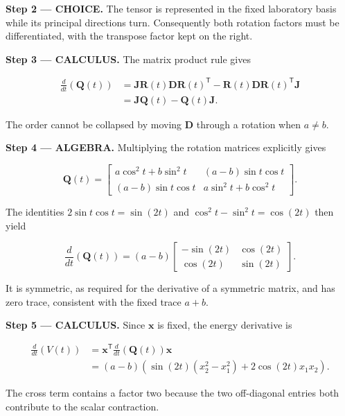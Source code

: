 \documentclass[11pt,oneside,openany]{book}
\begin{document}
\begin{ChoiceStep}
\textbf{Step 2 --- CHOICE.} The tensor is represented in the fixed laboratory basis while its principal directions turn. Consequently both rotation factors must be differentiated, with the transpose factor kept on the right.

\end{ChoiceStep}
\textbf{Step 3 --- CALCULUS.} The matrix product rule gives

\[
\begin{aligned}
\frac{d}{dt}\left(\mathbf Q(t)\right)
&=\mathbf J\mathbf R(t)\mathbf D\mathbf R(t)^{\mathsf T}
-\mathbf R(t)\mathbf D\mathbf R(t)^{\mathsf T}\mathbf J\\
&=\mathbf J\mathbf Q(t)-\mathbf Q(t)\mathbf J.
\end{aligned}
\]

The order cannot be collapsed by moving \(\mathbf D\) through a rotation when \(a\ne b\).

\begingroup\color{AlgebraBlue}
\textbf{Step 4 --- ALGEBRA.} Multiplying the rotation matrices explicitly gives

\[
\mathbf Q(t)=\begin{bmatrix}
a\cos^2t+b\sin^2t&(a-b)\sin t\cos t\\
(a-b)\sin t\cos t&a\sin^2t+b\cos^2t
\end{bmatrix}.
\]

The identities \(2\sin t\cos t=\sin(2t)\) and \(\cos^2t-\sin^2t=\cos(2t)\) then yield

\[
\frac{d}{dt}\left(\mathbf Q(t)\right)
=(a-b)\begin{bmatrix}-\sin(2t)&\cos(2t)\\\cos(2t)&\sin(2t)\end{bmatrix}.
\]

It is symmetric, as required for the derivative of a symmetric matrix, and has zero trace, consistent with the fixed trace \(a+b\).

\endgroup
\textbf{Step 5 --- CALCULUS.} Since \(\mathbf x\) is fixed, the energy derivative is

\[
\begin{aligned}
\frac{d}{dt}\left(V(t)\right)
&=\mathbf x^{\mathsf T}\frac{d}{dt}\left(\mathbf Q(t)\right)\mathbf x\\
&=(a-b)\left(\sin(2t)(x_2^2-x_1^2)+2\cos(2t)x_1x_2\right).
\end{aligned}
\]

The cross term contains a factor two because the two off-diagonal entries both contribute to the scalar contraction.
\end{document}
